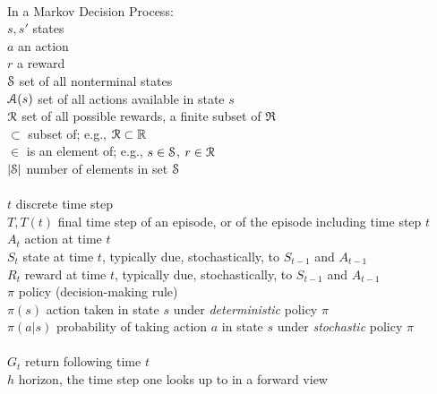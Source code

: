 \documentclass[a4paper, twoside, 12pt]{article}
\begin{document}
\begin{tabbing}
    \\
    \>In a Markov Decision Process:\\
    \>$s, s'$             \> states\\
    \>$a$                 \> an action\\
    \>$r$                 \> a reward\\
    \>$\S$                \> set of all nonterminal states \\
    \>$\A(s)$             \> set of all actions available in state $s$\\
    \>$\R$                \> set of all possible rewards, a finite subset of $\Re$\\
    \>$\subset$           \> subset of; e.g., $\R\subset\Re$\\
    \>$\in$               \> is an element of; e.g., $s\in\S$, $r\in\R$\\
    \>$|\S|$              \> number of elements in set $\S$\\
    \\
    \>$t$                 \> discrete time step\\
    \>$T, T(t)$           \> final time step of an episode, or of the episode including time step $t$\\
    \>$A_t$               \> action at time $t$\\
    \>$S_t$               \> state at time $t$, typically due, stochastically, to $S_{t-1}$ and $A_{t-1}$\\
    \>$R_t$               \> reward at time $t$, typically due, stochastically, to $S_{t-1}$ and $A_{t-1}$\\
    \>$\pi$               \> policy (decision-making rule)\\
    \>$\pi(s)$            \> action taken in state $s$ under {\it deterministic\/} policy $\pi$\\
    \>$\pi(a|s)$          \> probability of taking action $a$ in state $s$ under {\it stochastic\/} policy $\pi$\\
    \\
    \>$G_t$               \> return following time $t$\\
    \>$h$                 \> horizon, the time step one looks up to in a forward view\\

\end{tabbing}
\end{document}
